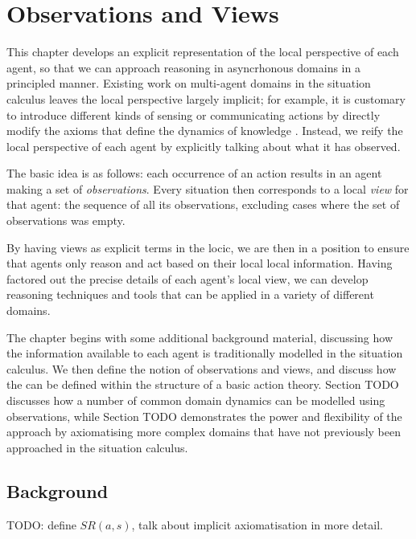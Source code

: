 

\chapter{Observations and Views}

\label{ch:observations}

This chapter develops an explicit representation of the local perspective
of each agent, so that we can approach reasoning in asyncrhonous domains
in a principled manner. Existing work on multi-agent domains in the
situation calculus leaves the local perspective largely implicit;
for example, it is customary to introduce different kinds of sensing
or communicating actions by directly modify the axioms that define
the dynamics of knowledge \citep{scherl03sc_knowledge,Lesperance99sitcalc_approach}.
Instead, we reify the local perspective of each agent by explicitly
talking about what it has observed.

The basic idea is as follows: each occurrence of an action results
in an agent making a set of \emph{observations}. Every situation then
corresponds to a local \emph{view} for that agent: the sequence of
all its observations, excluding cases where the set of observations
was empty.

By having views as explicit terms in the locic, we are then in a position
to ensure that agents only reason and act based on their local local
information. Having factored out the precise details of each agent's
local view, we can develop reasoning techniques and tools that can
be applied in a variety of different domains.

The chapter begins with some additional background material, discussing
how the information available to each agent is traditionally modelled
in the situation calculus. We then define the notion of observations
and views, and discuss how the can be defined within the structure
of a basic action theory. Section TODO discusses how a number of common
domain dynamics can be modelled using observations, while Section
TODO demonstrates the power and flexibility of the approach by axiomatising
more complex domains that have not previously been approached in the
situation calculus.


\section{Background}

TODO: define $SR(a,s)$, talk about implicit axiomatisation in more
detail.


